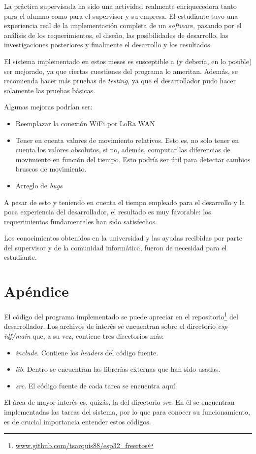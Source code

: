 \documentclass{article}
\newcommand{ \fnrepo }{\footnote{\url{www.github.com/tsarquis88/esp32_freertos}}}
\begin{document}
    La práctica supervisada ha sido una actividad realmente enriquecedora tanto
    para el alumno como para el supervisor y su empresa. El estudiante tuvo una
    experiencia real de la implementación completa de un \emph{software}, 
    pasando por el análisis de los requerimientos, el diseño, las posibilidades
    de desarrollo, las investigaciones posteriores y finalmente el desarrollo y
    los resultados. \par
    El sistema implementado en estos meses es susceptible a (y debería, en lo 
    posible) ser mejorado, ya que ciertas cuestiones del programa lo ameritan.
    Además, se recomienda hacer más pruebas de \emph{testing}, ya que el 
    desarrollador pudo hacer solamente las pruebas básicas. \par
    Algunas mejoras podrían ser:
    \begin{itemize}
        \item Reemplazar la conexión WiFi por LoRa WAN
        \item Tener en cuenta valores de movimiento relativos. Esto es, no solo
        tener en cuenta los valores absolutos, si no, además, computar las 
        diferencias de movimiento en función del tiempo. Esto podría ser útil
        para detectar cambios bruscos de movimiento.
        \item Arreglo de \emph{bugs}
    \end{itemize} \par
    A pesar de esto y teniendo en cuenta el tiempo empleado para el desarrollo 
    y la poca experiencia del desarrollador, el resultado es muy favorable: los
    requerimientos fundamentales han sido satisfechos. \par
    Los conocimientos obtenidos en la universidad y las ayudas recibidas por
    parte del supervisor y de la comunidad informática, fueron de necesidad para
    el estudiante.


\newpage
\section{Apéndice}

El código del programa implementado se puede apreciar en el repositorio\fnrepo 
del desarrollador. Los archivos de interés se encuentran
sobre el directorio \emph{esp-idf/main} que, a su vez, contiene tres 
directorios más:
\begin{itemize}
    \item \emph{include}. Contiene los \emph{headers} del código fuente.
    \item \emph{lib}. Dentro se encuentran las librerías externas que han sido 
    usadas.
    \item \emph{src}. El código fuente de cada tarea se encuentra aquí.
\end{itemize} \par
El área de mayor interés es, quizás, la del directorio \emph{src}. En él se 
encuentran implementadas las tareas del sistema, por lo que para conocer su
funcionamiento, es de crucial importancia entender estos códigos.

\end{document}
